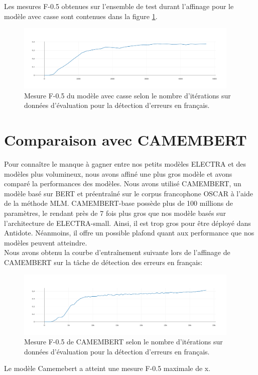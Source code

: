 \documentclass[12pt,twoside,maitrise]{dms}
\theoremstyle{definition}
\numberwithin{equation}{section}
\numberwithin{table}{chapter}
\numberwithin{figure}{chapter}
\begin{document}
Les mesures F-0.5 obtenues sur l'ensemble de test durant
l'affinage pour le modèle avec casse sont contenues dans la figure
\ref{fig:f05electraaveccasse}.
\begin{figure}
	\begin{center}
		\includegraphics[width=0.95\textwidth]{figures/electraaveccassef05.png}
	\end{center}
	\caption{Mesure F-0.5 du modèle avec casse selon le nombre d'itérations sur
		données d'évaluation pour la détection d'erreurs en
		français.}\label{fig:f05electraaveccasse}
\end{figure}


\section{Comparaison avec CAMEMBERT}
Pour connaître le manque à gagner entre nos petits modèles ELECTRA et des
modèles plus volumineux, nous avons affiné une plus gros modèle et avons
comparé la performances des modèles. Nous avons utilisé CAMEMBERT, un modèle
basé sur BERT et préentraîné sur le corpus francophone OSCAR à l'aide de la
méthode MLM. CAMEMBERT-base possède plus de 100 millions de paramètres, le rendant
près de 7 fois plus gros que nos modèle basés sur l'architecture de
ELECTRA-small. Ainsi, il est trop gros pour être déployé dans Antidote.
Néanmoins, il offre un possible plafond quant aux performance que nos modèles
peuvent atteindre. \\

Nous avons obtenu la courbe d'entraînement suivante lors de l'affinage de
CAMEMBERT sur la tâche de détection des erreurs en français:
\begin{figure}
	\begin{center}
		\includegraphics[width=0.95\textwidth]{figures/camembertbasef05100epoquesnat.png}
	\end{center}
	\caption{Mesure F-0.5 de CAMEMBERT selon le nombre d'itérations sur
		données d'évaluation pour la détection d'erreurs en
		français.}\label{fig:f05camembert}
\end{figure}
Le modèle Camemebert a atteint une mesure F-0.5 maximale de x.
\end{document}
